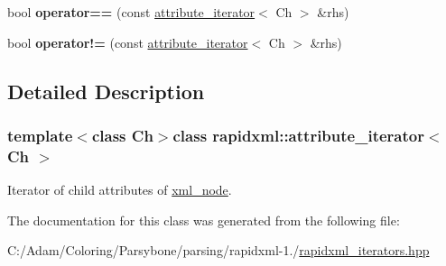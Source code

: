 \begin{DoxyCompactItemize}
\item 
\hypertarget{classrapidxml_1_1attribute__iterator_ab1dc8dd11d21e145a4e3f76d46aead0d}{bool {\bfseries operator==} (const \hyperlink{classrapidxml_1_1attribute__iterator}{attribute\-\_\-iterator}$<$ Ch $>$ \&rhs)}\label{classrapidxml_1_1attribute__iterator_ab1dc8dd11d21e145a4e3f76d46aead0d}

\item 
\hypertarget{classrapidxml_1_1attribute__iterator_a39e8cf336c324521fd9c720abf280d88}{bool {\bfseries operator!=} (const \hyperlink{classrapidxml_1_1attribute__iterator}{attribute\-\_\-iterator}$<$ Ch $>$ \&rhs)}\label{classrapidxml_1_1attribute__iterator_a39e8cf336c324521fd9c720abf280d88}

\end{DoxyCompactItemize}


\subsection{Detailed Description}
\subsubsection*{template$<$class Ch$>$class rapidxml\-::attribute\-\_\-iterator$<$ Ch $>$}

Iterator of child attributes of \hyperlink{classrapidxml_1_1xml__node}{xml\-\_\-node}. 

The documentation for this class was generated from the following file\-:\begin{DoxyCompactItemize}
\item 
C\-:/\-Adam/\-Coloring/\-Parsybone/parsing/rapidxml-\/1./\hyperlink{rapidxml__iterators_8hpp}{rapidxml\-\_\-iterators.\-hpp}\end{DoxyCompactItemize}
